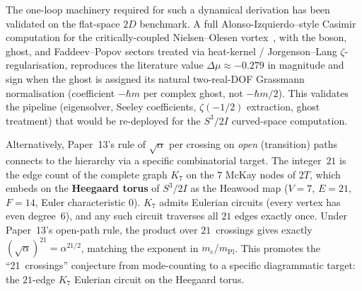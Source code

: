 \documentclass[11pt]{article}
\begin{document}
The one-loop machinery required for such a dynamical derivation has
been validated on the flat-space $2D$ benchmark.  A full
Alonso-Izquierdo--style Casimir computation for the critically-coupled
Nielsen--Olesen vortex~\cite{AlonsoIzquierdo2016,BaackeLavrelashvili2008},
with the boson, ghost, and Faddeev--Popov sectors treated via heat-kernel
/ Jorgenson--Lang $\zeta$-regularisation, reproduces the literature value
$\Delta\mu \approx -0.279$ in magnitude and sign when the ghost is
assigned its natural two-real-DOF Grassmann normalisation (coefficient
$-\hbar m$ per complex ghost, not $-\hbar m / 2$).  This validates the
pipeline (eigensolver, Seeley coefficients, $\zeta(-1/2)$ extraction,
ghost treatment) that would be re-deployed for the $S^3/2I$ curved-space
computation.

Alternatively, Paper~13's rule of $\sqrt{\alpha}$ per crossing
on \emph{open} (transition) paths connects to the hierarchy via
a specific combinatorial target.  The integer~$21$ is the edge
count of the complete graph $K_7$ on the $7$ McKay nodes of $2T$,
which embeds on the \textbf{Heegaard torus} of $S^3/2I$ as the
Heawood map ($V=7$, $E=21$, $F=14$, Euler characteristic $0$).
$K_7$ admits Eulerian circuits (every vertex has even
degree~$6$), and any such circuit traverses all $21$ edges
exactly once.  Under Paper~13's open-path rule, the product over
$21$~crossings gives exactly $(\sqrt{\alpha})^{21} = \alpha^{21/2}$,
matching the exponent in $m_e/m_\text{Pl}$.  This promotes the
``21~crossings'' conjecture from mode-counting to a specific
diagrammatic target: the $21$-edge $K_7$ Eulerian circuit on the
Heegaard torus.
\end{document}
